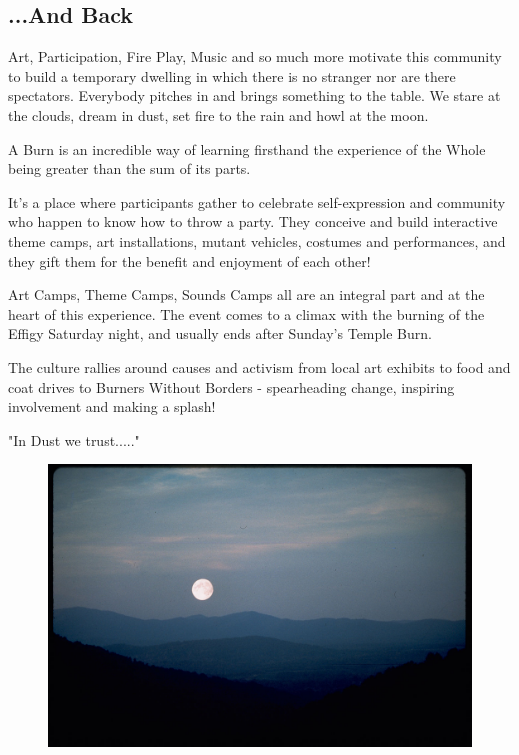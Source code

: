 \subsection*{...And Back}
Art, Participation, Fire Play, Music and so much more motivate this 
community to build a temporary dwelling in which there is no stranger nor are there spectators. Everybody pitches in and brings something to the table.  
We stare at the clouds, dream in dust, set fire to the rain and howl at the moon.  

A Burn is an incredible way of learning firsthand the experience of the Whole being greater than the sum of its parts.  

It's a place where participants gather to celebrate self-expression and community who happen to know how to throw a party.  They conceive and build interactive theme camps, art installations, mutant vehicles, costumes and performances, and they gift them for the benefit and enjoyment of each other!

Art Camps, Theme Camps, Sounds Camps all are an integral part and at the heart of this experience.  The event comes to a climax with the burning of the Effigy Saturday night, and usually ends after Sunday's Temple Burn. 

The culture rallies around causes and activism from local art exhibits to food and coat drives to Burners Without Borders - spearheading change, inspiring involvement and making a splash! 

"In Dust we trust....."


\vspace*{\fill}
\begin{figure}[!h]
\centering
\includegraphics[width=.8\textwidth, trim=10 0 50 0, clip]{images/ShenandoahMoon}
\label{image:mountainmoom}
\end{figure}
\vspace*{\fill}
